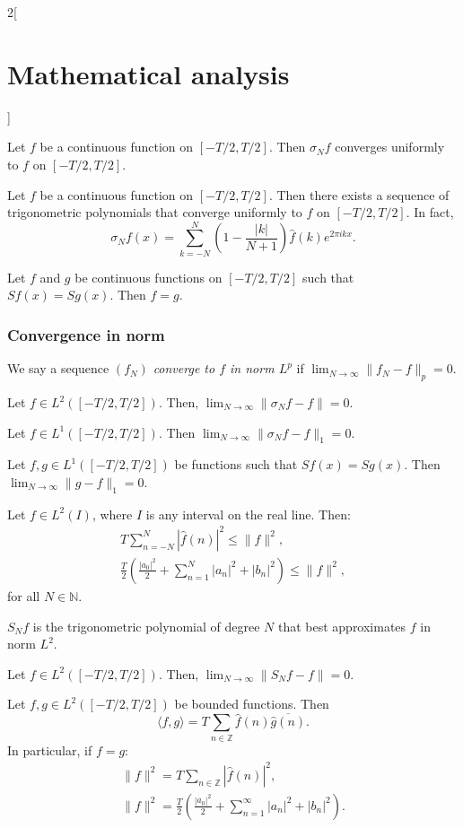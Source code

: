 \documentclass[class=article,crop=false]{standalone}
\begin{document}
\begin{multicols}{2}[\section{Mathematical analysis}]
\begin{theorem}
Let $f$ be a continuous function on $[-T/2,T/2]$. Then $\sigma_Nf$ converges uniformly to $f$ on $[-T/2,T/2]$.
\end{theorem}
\begin{corollary}
Let $f$ be a continuous function on $[-T/2,T/2]$. Then there exists a sequence of trigonometric polynomials that converge uniformly to $f$ on $[-T/2,T/2]$. In fact, $$\sigma_Nf(x)=\sum_{k=-N}^N\left(1-\frac{|k|}{N+1}\right)\widehat{f}(k)e^{2\pi ikx}.$$
\end{corollary}
\begin{corollary}
Let $f$ and $g$ be continuous functions on $[-T/2,T/2]$ such that $Sf(x)=Sg(x)$. Then $f=g$.
\end{corollary}
\subsubsection*{Convergence in norm}
\begin{definition}
We say a sequence $(f_N)$ \textit{converge to $f$ in norm $L^p$} if $\displaystyle\lim_{N\to\infty}\|f_N-f\|_p=0$.
\end{definition}
\begin{theorem}
Let $f\in L^2([-T/2,T/2])$. Then, $\displaystyle\lim_{N\to\infty}\|\sigma_Nf-f\|=0$.
\end{theorem}
\begin{corollary}
Let $f\in L^1([-T/2,T/2])$. Then $\displaystyle\lim_{N\to\infty}\|\sigma_Nf-f\|_1=0$.
\end{corollary}
\begin{corollary}
Let $f,g\in L^1([-T/2,T/2])$ be functions such that $Sf(x)=Sg(x)$. Then $\displaystyle\lim_{N\to\infty}\|g-f\|_1=0$.
\end{corollary}
\begin{theorem}
Let $f\in L^2(I)$, where $I$ is any interval on the real line. Then: \begin{gather*}T\sum_{n=-N}^N|\widehat{f}(n)|^2\leq\|f\|^2,\\\frac{T}{2}\left(\frac{|a_0|^2}{2}+\sum_{n=1}^N|a_n|^2+|b_n|^2\right)\leq \|f\|^2,\end{gather*} for all $N\in\mathbb{N}$.
\end{theorem}
\begin{theorem}
$S_Nf$ is the trigonometric polynomial of degree $N$ that best approximates $f$ in norm $L^2$.
\end{theorem}
\begin{corollary}
Let $f\in L^2([-T/2,T/2])$. Then, $\displaystyle\lim_{N\to\infty}\|S_Nf-f\|=0$.
\end{corollary}
\begin{theorem}
Let $f,g\in L^2([-T/2,T/2])$ be bounded functions. Then $$\langle f,g\rangle=T\sum_{n\in\mathbb{Z}}\widehat{f}(n)\overline{\widehat{g}(n)}.$$
In particular, if $f=g$:
\begin{gather*}\|f\|^2=T\sum_{n\in\mathbb{Z}}|\widehat{f}(n)|^2,\\\|f\|^2=\frac{T}{2}\left(\frac{|a_0|^2}{2}+\sum_{n=1}^\infty|a_n|^2+|b_n|^2\right).\end{gather*}
\end{theorem}

\end{multicols}
\end{document}
